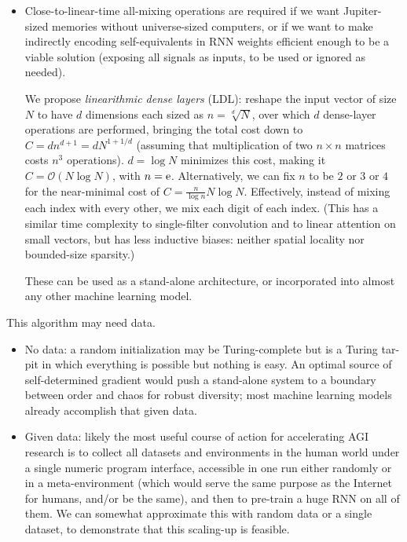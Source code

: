 \documentclass{article}
\begin{document}
\begin{itemize}
\item Close-to-linear-time all-mixing operations are required if we want Jupiter-sized memories without universe-sized computers, or if we want to make indirectly encoding self-equivalents in RNN weights efficient enough to be a viable solution (exposing all signals as inputs, to be used or ignored as needed).

We propose \textit{linearithmic dense layers} (LDL): reshape the input vector of size $N$ to have $d$ dimensions each sized as $n=\sqrt[d]{N}$, over which $d$ dense-layer operations are performed, bringing the total cost down to $C=dn^{d+1}=d N^{1+1/d}$ (assuming that multiplication of two $n \times n$ matrices costs $n^3$ operations). $d=\log{N}$ minimizes this cost, making it $C=\mathcal{O}(N \log{N})$, with $n={\rm e}$. Alternatively, we can fix $n$ to be $2$ or $3$ or $4$ for the near-minimal cost of $C=\frac{n}{\log{n}} N \log{N}$. Effectively, instead of mixing each index with every other, we mix each digit of each index. (This has a similar time complexity to single-filter convolution and to linear attention \cite{vaswani2017attention} on small vectors, but has less inductive biases: neither spatial locality nor bounded-size sparsity.)

These can be used as a stand-alone architecture, or incorporated into almost any other machine learning model.
\end{itemize}

This algorithm may need data.
\begin{itemize}
\item No data: a random initialization may be Turing-complete but is a Turing tar-pit \cite{10.1145/947955.1083808} in which everything is possible but nothing is easy. An optimal source of self-determined gradient would push a stand-alone system to a boundary between order and chaos \cite{feng2020optimal} for robust diversity; most machine learning models already accomplish that given data.
\item Given data: likely the most useful course of action for accelerating AGI research is to collect all datasets and environments in the human world under a single numeric program interface, accessible in one run either randomly or in a meta-environment (which would serve the same purpose as the Internet for humans, and/or be the same), and then to pre-train a huge RNN on all of them. We can somewhat approximate this with random data or a single dataset, to demonstrate that this scaling-up is feasible.
\end{itemize}
\end{document}
